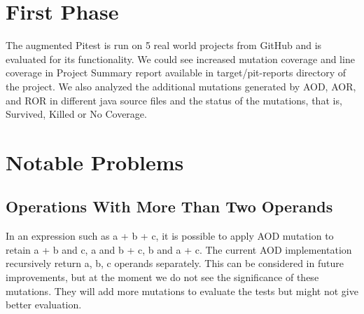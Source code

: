 \section{First Phase}





The augmented Pitest is run on 5 real world projects from GitHub and is evaluated for its functionality.
We could see increased mutation coverage and line coverage in Project Summary report available in target/pit-reports directory of the project.
We also analyzed the additional mutations generated by AOD, AOR, and ROR in different java source files and the status of the mutations, that is, Survived, Killed or No Coverage.

\section{Notable Problems}
\subsection{Operations With More Than Two Operands}
In an expression such as a + b + c, it is possible to apply AOD mutation to retain a + b and c, a and b + c, b and a + c. The current AOD implementation recursively return a, b, c operands separately. This can be considered in future improvements, but at the moment we do not see the significance of these mutations. They will add more mutations to evaluate the tests but might not give better evaluation. 

